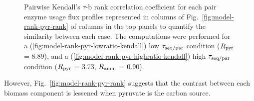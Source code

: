 \begin{figure}
  \caption{
    Pairwise Kendall's $\tau$-b rank correlation coefficient for each pair enzyme usage flux profiles represented in columns of Fig.\ \ref{fig:model-rank-pyr-rank} of columns in the top panels to quantify the similarity between each case.
    The computations were performed for a (\ref{fig:model-rank-pyr-lowratio-kendall}) low $\tau_{\mathrm{seq}/\mathrm{par}}$ condition ($R_{\mathrm{pyr}}$ = \SI{8.89}{\mmolgdwh}), and a (\ref{fig:model-rank-pyr-highratio-kendall}) high $\tau_{\mathrm{seq}/\mathrm{par}}$ condition ($R_{\mathrm{pyr}}$ = \SI{3.73}{\mmolgdwh}, $R_{\mathrm{amm}}$ = \SI{0.90}{\mmolgdwh}).
  }
  \label{fig:model-rank-pyr-kendall}
\end{figure}

However, Fig.\ \ref{fig:model-rank-pyr-rank} suggests that the contrast between each biomass component is lessened when pyruvate is the carbon source.

